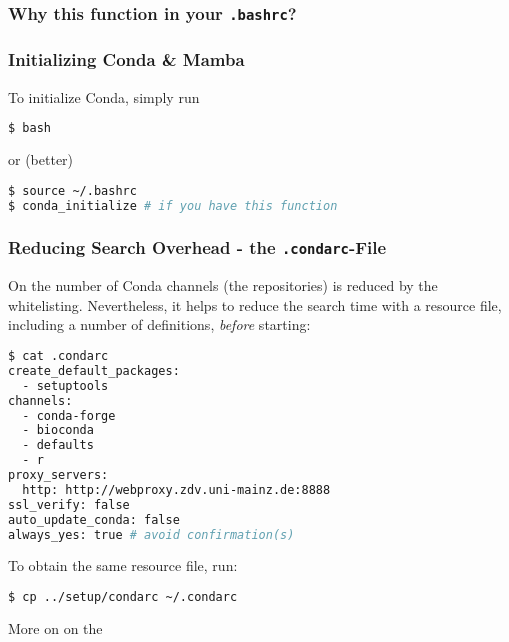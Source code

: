 \begin{frame}[fragile]
  \frametitle{Why this function in your \texttt{.bashrc}?}
\end{frame}

\begin{frame}[fragile]
  \frametitle{Initializing Conda \& Mamba}
  To initialize Conda, simply run
  \begin{lstlisting}[language=Bash, style=Shell]
$ bash
  \end{lstlisting}
  or (better)
  \begin{lstlisting}[language=Bash, style=Shell]
$ source ~/.bashrc
$ conda_initialize # if you have this function
  \end{lstlisting}
\end{frame}


\begin{frame}[fragile]
  \frametitle{Reducing Search Overhead - the \texttt{.condarc}-File}
  On \mogon{} the number of Conda channels (the repositories) is reduced by the whitelisting. Nevertheless, it helps to reduce the search time with a resource file, including  a number of definitions, \emph{before} starting:
  \begin{lstlisting}[language=Bash, style=Shell, basicstyle=\tiny]
$ cat .condarc
create_default_packages:
  - setuptools
channels:
  - conda-forge
  - bioconda
  - defaults
  - r
proxy_servers:
  http: http://webproxy.zdv.uni-mainz.de:8888
ssl_verify: false
auto_update_conda: false
always_yes: true # avoid confirmation(s)
  \end{lstlisting}
  To obtain the same resource file, run:
  \begin{lstlisting}[language=Bash, style=Shell, basicstyle=\footnotesize]
$ cp ../setup/condarc ~/.condarc
  \end{lstlisting}
  More on  on the 
\end{frame}

